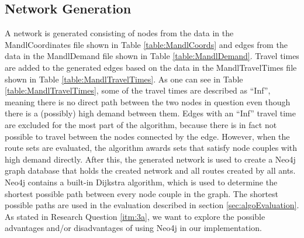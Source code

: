 \subsection{Network Generation}
A network is generated consisting of nodes from the data in the MandlCoordinates file shown in Table \vref{table:MandlCoords} and edges from the data in the MandlDemand file shown in Table \vref{table:MandlDemand}. Travel times are added to the generated edges based on the data in the MandlTravelTimes file shown in Table \vref{table:MandlTravelTimes}. As one can see in Table \ref{table:MandlTravelTimes}, some of the travel times are described as ``Inf'', meaning there is no direct path between the two nodes in question even though there is a (possibly) high demand between them. Edges with an ``Inf'' travel time are excluded for the most part of the algorithm, because there is in fact not possible to travel between the nodes connected by the edge. However, when the route sets are evaluated, the algorithm awards sets that satisfy node couples with high demand directly. After this, the generated network is used to create a Neo4j graph database that holds the created network and all routes created by all ants. Neo4j contains a built-in Dijkstra algorithm, which is used to determine the shortest possible path between every node couple in the graph. The shortest possible paths are used in the evaluation described in section \vref{sec:algoEvaluation}. As stated in Research Question \vref{itm:3a}, we want to explore the possible advantages and/or disadvantages of using Neo4j in our implementation.
